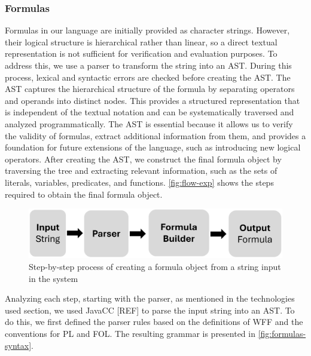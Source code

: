 
\subsubsection{Formulas}
Formulas in our language are initially provided as character strings. However, their logical structure is hierarchical rather than linear, so a direct textual representation is not sufficient for verification and evaluation purposes. To address this, we use a parser to transform the string into an \gls{AST}. During this process, lexical and syntactic errors are checked before creating the \gls{AST}. The \gls{AST} captures the hierarchical structure of the formula by separating operators and operands into distinct nodes. This provides a structured representation that is independent of the textual notation and can be systematically traversed and analyzed programmatically. The \gls{AST} is essential because it allows us to verify the validity of formulas, extract additional information from them, and provides a foundation for future extensions of the language, such as introducing new logical operators. After creating the \gls{AST}, we construct the final formula object by traversing the tree and extracting relevant information, such as the sets of literals, variables, predicates, and functions. \autoref{fig:flow-exp} shows the steps required to obtain the final formula object.

\begin{figure}[h]
    \centering
    \includegraphics[width=0.85\linewidth]{Chapters/Figures/exp-flow.png}
    \caption{Step-by-step process of creating a formula object from a string input in the system}
    \label{fig:flow-exp}
\end{figure}

Analyzing each step, starting with the parser, as mentioned in the technologies used section, we used JavaCC [REF] to parse the input string into an \gls{AST}. To do this, we first defined the parser rules based on the definitions of \gls{WFF} and the conventions for \gls{PL} and \gls{FOL}. The resulting grammar is presented in \autoref{fig:formulas-syntax}.

